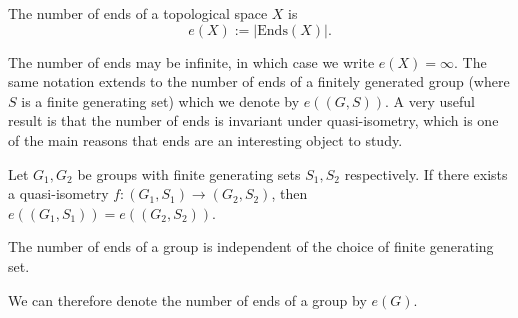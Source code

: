 \begin{definition}
    The number of ends of a topological space \(X\) is 
    \[
        e(X) := |\mathrm{Ends}(X)|.
    \]
\end{definition}

The number of ends may be infinite, in which case we write \(e(X) = \infty\). The same notation extends to the number of ends of a finitely generated group (where \(S\) is a finite generating set) which we denote by \(e((G,S))\). A very useful result is that the number of ends is invariant under quasi-isometry, which is one of the main reasons that ends are an interesting object to study. 

\begin{theorem} \cite[p.~145]{bridson_haefliger_metric_1999}
    Let \(G_1,G_2\) be groups with finite generating sets \(S_1,S_2\) respectively. If there exists a quasi-isometry \(f: (G_1, S_1) \to (G_2,S_2)\), then \(e((G_1,S_1)) = e((G_2,S_2))\).
\end{theorem}

\begin{corollary}
    The number of ends of a group is independent of the choice of finite generating set.
\end{corollary}

We can therefore denote the number of ends of a group by \(e(G)\). 

